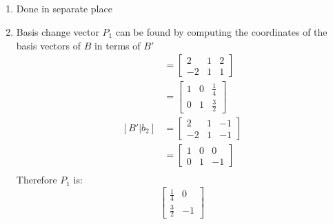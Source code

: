 \documentclass[12pt]{article}
\begin{document}
        \subsection{}
            \begin{enumerate}[label=\alph*.]
                \item Done in separate place
                \item Basis change vector $P_1$ can be found by computing the coordinates of the basis vectors of $B$ in terms of $B'$
                    \begin{align*}
                        [B' | b_1] &=
                        \left[\begin{array}{cc|c}
                             2 & 1 & 2\\
                            -2 & 1 & 1
                        \end{array}\right]\\
                        &= \left[\begin{array}{cc|c}
                            1 & 0 & \frac{1}{4}\\
                            0 & 1 & \frac{3}{2}
                       \end{array}\right]\\
                        [B' | b_2] &=
                        \left[\begin{array}{cc|c}
                             2 & 1 & -1\\
                            -2 & 1 & -1
                        \end{array}\right]\\
                        &= \left[\begin{array}{cc|c}
                            1 & 0 & 0\\
                            0 & 1 & -1
                       \end{array}\right]\\
                    \end{align*}
                    Therefore $P_1$ is:
                        \begin{equation*}
                            \left[\begin{matrix}
                                \frac{1}{4} & 0\\
                                \frac{3}{2} & -1
                            \end{matrix}\right]
                        \end{equation*}

\end{enumerate}
\end{document}
